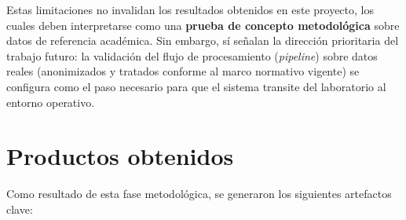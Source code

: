 \documentclass[IB]{TFUOC}%
\begin{document}
\noindent Estas limitaciones no invalidan los resultados obtenidos en este proyecto, los cuales deben interpretarse como una \textbf{prueba de concepto metodológica} sobre datos de referencia académica. Sin embargo, sí señalan la dirección prioritaria del trabajo futuro: la validación del flujo de procesamiento (\textit{pipeline}) sobre datos reales (anonimizados y tratados conforme al marco normativo vigente) se configura como el paso necesario para que el sistema transite del laboratorio al entorno operativo.


    
\section{Productos obtenidos}
Como resultado de esta fase metodológica, se generaron los siguientes artefactos clave:
\end{document}
